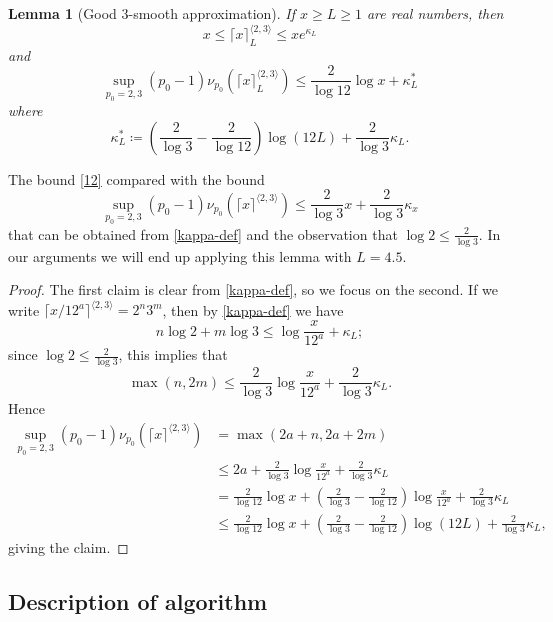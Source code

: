 \documentclass[12pt,a4paper,reqno]{amsart}
\numberwithin{equation}{section}
\theoremstyle{plain}
\newtheorem{lemma}[theorem]{Lemma}
\theoremstyle{definition}
\begin{document}
\begin{lemma}[Good $3$-smooth approximation]\label{val} If $x \geq L \geq 1$ are real numbers, then
$$ x \leq \lceil x \rceil^{\langle 2,3\rangle}_L \leq x e^{\kappa_L}$$
and
\begin{equation}\label{12}
   \sup_{p_0=2,3} (p_0-1) \nu_{p_0}(\lceil x \rceil^{\langle 2,3\rangle}_L) \leq \frac{2}{\log 12} \log x + \kappa^*_L
\end{equation}
where
\begin{equation}\label{kappastar-def}
\kappa^*_L \coloneqq \left(\frac{2}{\log 3} - \frac{2}{\log 12}\right) \log(12L) + \frac{2}{\log 3} \kappa_L.
\end{equation}
\end{lemma}

The bound \eqref{12} compared with the bound
$$ \sup_{p_0=2,3} (p_0-1) \nu_{p_0}(\lceil x \rceil^{\langle 2,3\rangle}) \leq \frac{2}{\log 3} x + \frac{2}{\log 3} \kappa_x$$
that can be obtained from \eqref{kappa-def} and the observation that $\log 2 \leq \frac{2}{\log 3}$.  In our arguments we will end up applying this lemma with $L=4.5$.

\begin{proof} The first claim is clear from \eqref{kappa-def}, so we focus on the second.  If we write $\lceil x/12^a \rceil^{\langle 2,3 \rangle} = 2^n 3^m$, then by \eqref{kappa-def} we have
$$ n \log 2 + m \log 3 \leq \log \frac{x}{12^a} + \kappa_L;$$
since $\log 2 \leq \frac{2}{\log 3}$, this implies that
$$ \max( n, 2m ) \leq \frac{2}{\log 3} \log \frac{x}{12^a}
+ \frac{2}{\log 3} \kappa_L.$$
Hence 
\begin{align*}
  \sup_{p_0=2,3} (p_0-1) \nu_{p_0}(\lceil x \rceil^{\langle 2,3\rangle}) &= \max(2a+n, 2a+2m) \\
  &\leq 2a + \frac{2}{\log 3} \log \frac{x}{12^a}
  + \frac{2}{\log 3} \kappa_L \\
  &= \frac{2}{\log 12} \log x + 
  \left(\frac{2}{\log 3} - \frac{2}{\log 12}\right) \log \frac{x}{12^a}
  + \frac{2}{\log 3} \kappa_L \\
  & \leq \frac{2}{\log 12} \log x + 
  \left(\frac{2}{\log 3} - \frac{2}{\log 12}\right) \log(12L)
  + \frac{2}{\log 3} \kappa_L,
\end{align*}
giving the claim.
\end{proof}

\subsection{Description of algorithm}\label{alg-desc}
\end{document}
